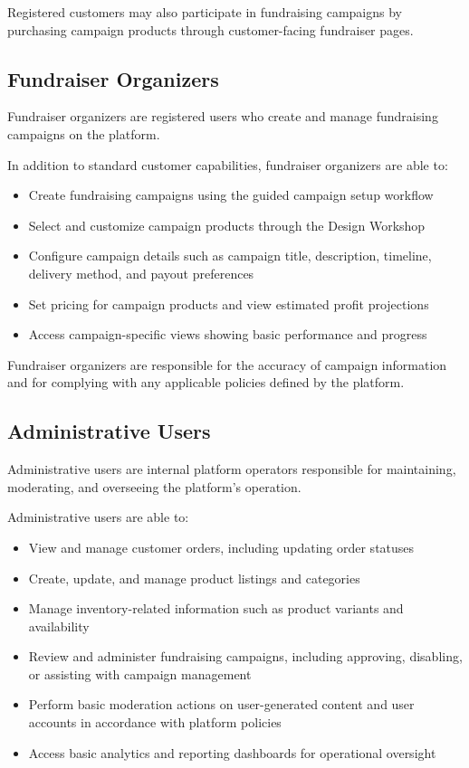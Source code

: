 Registered customers may also participate in fundraising campaigns by purchasing
campaign products through customer-facing fundraiser pages.

\subsection{Fundraiser Organizers}

Fundraiser organizers are registered users who create and manage fundraising
campaigns on the platform.

In addition to standard customer capabilities, fundraiser organizers are able to:
\begin{itemize}[leftmargin=1.5em]
    \item Create fundraising campaigns using the guided campaign setup workflow
    \item Select and customize campaign products through the Design Workshop
    \item Configure campaign details such as campaign title, description, timeline,
    delivery method, and payout preferences
    \item Set pricing for campaign products and view estimated profit projections
    \item Access campaign-specific views showing basic performance and progress
\end{itemize}

Fundraiser organizers are responsible for the accuracy of campaign information
and for complying with any applicable policies defined by the platform.

\subsection{Administrative Users}

Administrative users are internal platform operators responsible for maintaining,
moderating, and overseeing the platform's operation.

Administrative users are able to:
\begin{itemize}[leftmargin=1.5em]
    \item View and manage customer orders, including updating order statuses
    \item Create, update, and manage product listings and categories
    \item Manage inventory-related information such as product variants and
    availability
    \item Review and administer fundraising campaigns, including approving,
    disabling, or assisting with campaign management
    \item Perform basic moderation actions on user-generated content and user
    accounts in accordance with platform policies
    \item Access basic analytics and reporting dashboards for operational oversight
\end{itemize}

